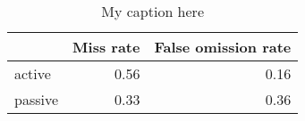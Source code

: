 \begin{table}[!ht]
\centering
\begin{tabular}{lrr}
\toprule
{} &  Miss rate &  False omission rate \\
\midrule
active  &       0.56 &                 0.16 \\
passive &       0.33 &                 0.36 \\
\bottomrule
\end{tabular}
\caption{My caption here}
\label{tab:VOICE-ocd-combined-errors}
\end{table}